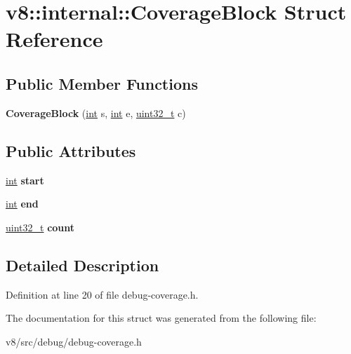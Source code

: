 \hypertarget{structv8_1_1internal_1_1CoverageBlock}{}\section{v8\+:\+:internal\+:\+:Coverage\+Block Struct Reference}
\label{structv8_1_1internal_1_1CoverageBlock}
\subsection*{Public Member Functions}
\begin{DoxyCompactItemize}
\item 
\mbox{\label{structv8_1_1internal_1_1CoverageBlock_a497db9856fbc439917f79ff2202b8341}} 
{\bfseries Coverage\+Block} (\mbox{\hyperlink{classint}{int}} s, \mbox{\hyperlink{classint}{int}} e, \mbox{\hyperlink{classuint32__t}{uint32\+\_\+t}} c)
\end{DoxyCompactItemize}
\subsection*{Public Attributes}
\begin{DoxyCompactItemize}
\item 
\mbox{\label{structv8_1_1internal_1_1CoverageBlock_a2fa0a47595714033c276df58ad16b266}} 
\mbox{\hyperlink{classint}{int}} {\bfseries start}
\item 
\mbox{\label{structv8_1_1internal_1_1CoverageBlock_a7d0cd3a969fd4a44a09d925cd080126a}} 
\mbox{\hyperlink{classint}{int}} {\bfseries end}
\item 
\mbox{\label{structv8_1_1internal_1_1CoverageBlock_a65c2a69a413b6db0f71da08fad61061e}} 
\mbox{\hyperlink{classuint32__t}{uint32\+\_\+t}} {\bfseries count}
\end{DoxyCompactItemize}


\subsection{Detailed Description}


Definition at line 20 of file debug-\/coverage.\+h.



The documentation for this struct was generated from the following file\+:\begin{DoxyCompactItemize}
\item 
v8/src/debug/debug-\/coverage.\+h\end{DoxyCompactItemize}
